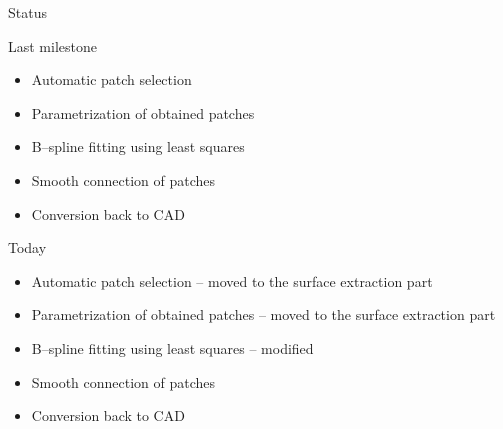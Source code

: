 \begin{frame}{Status}
\begin{block}{Last milestone}
\begin{itemize}
	\item[\textcolor{red}{\XSolidBrush}] Automatic patch selection
	\item[\textcolor{red}{\XSolidBrush}] Parametrization of obtained patches
	\item[\textcolor{green}{\Checkmark}] B--spline fitting using least squares
	\item[\textcolor{black}{\VarClock}] Smooth connection of patches
	\item[\textcolor{red}{\XSolidBrush}] Conversion back to CAD
\end{itemize}
\end{block}
\begin{block}{Today}
\begin{itemize}
	\item[\textcolor{green}{\Checkmark}] Automatic patch selection -- {\color{gray}moved to the surface extraction part}
	\item[\textcolor{green}{\Checkmark}] Parametrization of obtained patches -- {\color{gray}moved to the surface extraction part}
	\item[\textcolor{green}{\Checkmark}] B--spline fitting using least squares --  {\color{gray}modified}
	\item[\textcolor{green}{\Checkmark}] Smooth connection of patches
	\item[\textcolor{red}{\XSolidBrush}] Conversion back to CAD
\end{itemize}
\end{block}
\end{frame}


